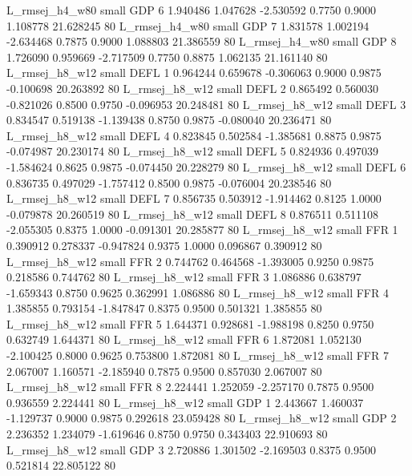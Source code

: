 L_rmsej_h4_w80      small      GDP                 6 1.940486 1.047628 -2.530592 0.7750 0.9000  1.108778   21.628245 80
L_rmsej_h4_w80      small      GDP                 7 1.831578 1.002194 -2.634468 0.7875 0.9000  1.088803   21.386559 80
L_rmsej_h4_w80      small      GDP                 8 1.726090 0.959669 -2.717509 0.7750 0.8875  1.062135   21.161140 80
L_rmsej_h8_w12      small     DEFL                 1 0.964244 0.659678 -0.306063 0.9000 0.9875 -0.100698   20.263892 80
L_rmsej_h8_w12      small     DEFL                 2 0.865492 0.560030 -0.821026 0.8500 0.9750 -0.096953   20.248481 80
L_rmsej_h8_w12      small     DEFL                 3 0.834547 0.519138 -1.139438 0.8750 0.9875 -0.080040   20.236471 80
L_rmsej_h8_w12      small     DEFL                 4 0.823845 0.502584 -1.385681 0.8875 0.9875 -0.074987   20.230174 80
L_rmsej_h8_w12      small     DEFL                 5 0.824936 0.497039 -1.584624 0.8625 0.9875 -0.074450   20.228279 80
L_rmsej_h8_w12      small     DEFL                 6 0.836735 0.497029 -1.757412 0.8500 0.9875 -0.076004   20.238546 80
L_rmsej_h8_w12      small     DEFL                 7 0.856735 0.503912 -1.914462 0.8125 1.0000 -0.079878   20.260519 80
L_rmsej_h8_w12      small     DEFL                 8 0.876511 0.511108 -2.055305 0.8375 1.0000 -0.091301   20.285877 80
L_rmsej_h8_w12      small      FFR                 1 0.390912 0.278337 -0.947824 0.9375 1.0000  0.096867    0.390912 80
L_rmsej_h8_w12      small      FFR                 2 0.744762 0.464568 -1.393005 0.9250 0.9875  0.218586    0.744762 80
L_rmsej_h8_w12      small      FFR                 3 1.086886 0.638797 -1.659343 0.8750 0.9625  0.362991    1.086886 80
L_rmsej_h8_w12      small      FFR                 4 1.385855 0.793154 -1.847847 0.8375 0.9500  0.501321    1.385855 80
L_rmsej_h8_w12      small      FFR                 5 1.644371 0.928681 -1.988198 0.8250 0.9750  0.632749    1.644371 80
L_rmsej_h8_w12      small      FFR                 6 1.872081 1.052130 -2.100425 0.8000 0.9625  0.753800    1.872081 80
L_rmsej_h8_w12      small      FFR                 7 2.067007 1.160571 -2.185940 0.7875 0.9500  0.857030    2.067007 80
L_rmsej_h8_w12      small      FFR                 8 2.224441 1.252059 -2.257170 0.7875 0.9500  0.936559    2.224441 80
L_rmsej_h8_w12      small      GDP                 1 2.443667 1.460037 -1.129737 0.9000 0.9875  0.292618   23.059428 80
L_rmsej_h8_w12      small      GDP                 2 2.236352 1.234079 -1.619646 0.8750 0.9750  0.343403   22.910693 80
L_rmsej_h8_w12      small      GDP                 3 2.720886 1.301502 -2.169503 0.8375 0.9500  0.521814   22.805122 80
